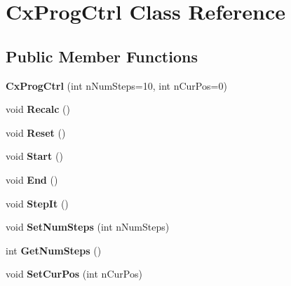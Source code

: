 \hypertarget{class_cx_prog_ctrl}{\section{Cx\-Prog\-Ctrl Class Reference}
\label{class_cx_prog_ctrl}
}
\subsection*{Public Member Functions}
\begin{DoxyCompactItemize}
\item 
\hypertarget{class_cx_prog_ctrl_ab1239f9a5f9f312bb1c774163c22f09a}{{\bfseries Cx\-Prog\-Ctrl} (int n\-Num\-Steps=10, int n\-Cur\-Pos=0)}\label{class_cx_prog_ctrl_ab1239f9a5f9f312bb1c774163c22f09a}

\item 
\hypertarget{class_cx_prog_ctrl_a210038a92ffcde4f3f6915f7a7fceecd}{void {\bfseries Recalc} ()}\label{class_cx_prog_ctrl_a210038a92ffcde4f3f6915f7a7fceecd}

\item 
\hypertarget{class_cx_prog_ctrl_a4cbd6ab812e583c05bec45589d703e45}{void {\bfseries Reset} ()}\label{class_cx_prog_ctrl_a4cbd6ab812e583c05bec45589d703e45}

\item 
\hypertarget{class_cx_prog_ctrl_a3a4773d831c16ae3ba0c9303c67ac649}{void {\bfseries Start} ()}\label{class_cx_prog_ctrl_a3a4773d831c16ae3ba0c9303c67ac649}

\item 
\hypertarget{class_cx_prog_ctrl_a38d056159cb307b03cdb8ec6ad2d20cb}{void {\bfseries End} ()}\label{class_cx_prog_ctrl_a38d056159cb307b03cdb8ec6ad2d20cb}

\item 
\hypertarget{class_cx_prog_ctrl_ab91aaf7c7a5a98536d1a750835688884}{void {\bfseries Step\-It} ()}\label{class_cx_prog_ctrl_ab91aaf7c7a5a98536d1a750835688884}

\item 
\hypertarget{class_cx_prog_ctrl_a2f186765f007587eb06fe15af8b20f37}{void {\bfseries Set\-Num\-Steps} (int n\-Num\-Steps)}\label{class_cx_prog_ctrl_a2f186765f007587eb06fe15af8b20f37}

\item 
\hypertarget{class_cx_prog_ctrl_a2869fe46ca9610b20cbee83aade07111}{int {\bfseries Get\-Num\-Steps} ()}\label{class_cx_prog_ctrl_a2869fe46ca9610b20cbee83aade07111}

\item 
\hypertarget{class_cx_prog_ctrl_ae05afe07cc88593dcd70a777179ec221}{void {\bfseries Set\-Cur\-Pos} (int n\-Cur\-Pos)}\label{class_cx_prog_ctrl_ae05afe07cc88593dcd70a777179ec221}


\end{DoxyCompactItemize}
